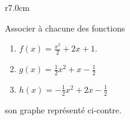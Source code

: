 
\begin{exercice}\label{exosmath-0271}

\begin{wrapfigure}{r}{7.0cm}
   \vspace{-2.5cm}        %
   \centering
   
\end{wrapfigure}

Associer à chacune des fonctions 
\begin{enumerate}
    \item
        \( f(x)=\frac{ x^2 }{2}+2x+1\).
\item
\( g(x)=\frac{ 1 }{2}x^2+x-\frac{ 1 }{2}\)
\item
    \( h(x)=-\frac{ 1 }{2}x^2+2x-\frac{ 1 }{2}\)
\end{enumerate}
son graphe représenté ci-contre.

\end{exercice}
